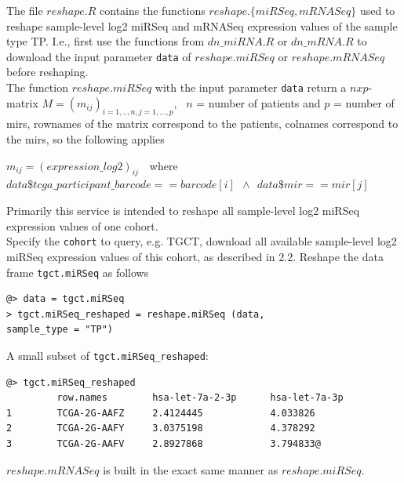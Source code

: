 \documentclass{TechReport}
\begin{document}
The file $reshape.R$ contains the functions $reshape.\{miRSeq, mRNASeq\}$
used to reshape sample-level log2 miRSeq and mRNASeq 
expression values of the sample type TP. I.e., first use the functions from 
$dn\_miRNA.R$ or $dn\_mRNA.R$ to download the input parameter {\tt data}
of $reshape.miRSeq$ or $reshape.mRNASeq$ before reshaping. \\
The function $reshape.miRSeq$ with the input parameter {\tt data} return a
$nxp$-matrix $M = (m_{ij})_{i=1,..,n, j=1,...,p}$, \ $n$ = number of patients and 
$p$ = number of mirs, rownames of the matrix correspond to the patients, colnames
correspond to the mirs,  so the following applies
\begin{center}
$m_{ij}= (expression\_log2)_{ij}$\ \  where \\
$data\$tcga\_participant\_barcode==barcode[i]\ \  \wedge\ \ data\$mir==mir[j] $
\end{center}
Primarily this service is intended to reshape all sample-level log2 miRSeq
expression values of one cohort. \\
Specify the {\tt cohort} to query, e.g. TGCT, download all available sample-level
log2 miRSeq expression values of this cohort, as described 
in 2.2.
Reshape the data frame {\tt tgct.miRSeq} as follows
\begin{lstlisting}[style=base]
@> data = tgct.miRSeq
> tgct.miRSeq_reshaped = reshape.miRSeq (data, 
sample_type = "TP")
\end{lstlisting}
A small subset of {\tt tgct.miRSeq\_reshaped}:
\begin{lstlisting}[style=base]
@> tgct.miRSeq_reshaped
         row.names        hsa-let-7a-2-3p      hsa-let-7a-3p
1        TCGA-2G-AAFZ     2.4124445            4.033826
2        TCGA-2G-AAFY     3.0375198            4.378292
3        TCGA-2G-AAFV     2.8927868            3.794833@
\end{lstlisting}
$reshape.mRNASeq$ is built in the exact same manner as $reshape.miRSeq$.

 
 
\end{document}

